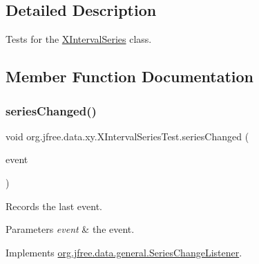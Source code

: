 \subsection{Detailed Description}
Tests for the \mbox{\hyperlink{classorg_1_1jfree_1_1data_1_1xy_1_1_x_interval_series}{X\+Interval\+Series}} class. 

\subsection{Member Function Documentation}
\mbox{\label{classorg_1_1jfree_1_1data_1_1xy_1_1_x_interval_series_test_a8c0912dbcbb4b7813965cbd9652d9002}} 
\subsubsection{\texorpdfstring{series\+Changed()}{seriesChanged()}}
{\footnotesize\ttfamily void org.\+jfree.\+data.\+xy.\+X\+Interval\+Series\+Test.\+series\+Changed (\begin{DoxyParamCaption}\item[{\mbox{\hyperlink{classorg_1_1jfree_1_1data_1_1general_1_1_series_change_event}{Series\+Change\+Event}}}]{event }\end{DoxyParamCaption})}

Records the last event.


\begin{DoxyParams}{Parameters}
{\em event} & the event. \\
\hline
\end{DoxyParams}


Implements \mbox{\hyperlink{interfaceorg_1_1jfree_1_1data_1_1general_1_1_series_change_listener_a441fd65d1290b91e0184124be928ebf7}{org.\+jfree.\+data.\+general.\+Series\+Change\+Listener}}.

\mbox{\label{classorg_1_1jfree_1_1data_1_1xy_1_1_x_interval_series_test_a3ea4a68ec1b209c3347293d98a5de680}} 
